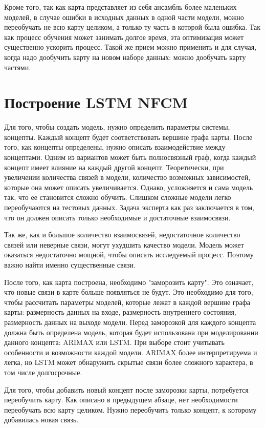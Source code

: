 Кроме того, так как карта представляет из себя ансамбль
более маленьких моделей, в случае ошибки в исходных данных
в одной части модели, можно переобучать не всю карту целиком,
а только ту часть в которой была ошибка. Так как процесс обучения
может занимать долгое время, эта оптимизация может существенно ускорить процесс.
Такой же прием можно применить и для случая, когда надо дообучить карту на
новом наборе данных: можно дообучать карту частями.

\section{Построение LSTM NFCM}

Для того, чтобы создать модель, нужно определить параметры системы, концепты.
Каждый концепт будет соответствовать вершине графа карты.
После того, как концепты определены, нужно описать взаимодействие между концептами.
Одним из вариантов может быть полносвязный граф, когда каждый концепт имеет
влияние на каждый другой концепт. Теоретически, при увеличении количества
связей в модели, количество возможных зависимостей, которые она может описать
увеличивается. Однако, усложняется и сама модель так, что ее становится сложно обучить.
Слишком сложные модели легко переобучаются на тестовых данных.
Задача эксперта как раз заключается в том, что он должен
описать только необходимые и достаточные взаимосвязи.

Так же, как и большое количество взаимосвязей,
недостаточное количество связей или неверные связи, могут ухудшить
качество модели. Модель может оказаться недостаточно мощной, чтобы описать
исследуемый процесс. Поэтому важно найти именно существенные связи.

После того, как карта построена, необходимо "заморозить карту".
Это означает, что новые связи в карте больше появляться не будут.
Это необходимо для того, чтобы рассчитать параметры моделей, которые
лежат в каждой вершине графа карты: размерность данных на входе,
размерность внутреннего состояния, размерность данных на выходе модели.
Перед заморозкой для каждого концепта должна быть определена модель,
которая будет использована при моделировании данного концепта: ARIMAX или LSTM.
При выборе стоит учитывать особенности и возможности каждой модели.
ARIMAX более интерпретируема и легка, но LSTM может обнаружить
скрытые связи более сложного характера, в том числе долгосрочные.

Для того, чтобы добавить новый концепт после заморозки карты,
потребуется переобучить карту. Как описано в предыдущем абзаце,
нет необходимости переобучать всю карту целиком. Нужно переобучить только
концепт, к которому добавилась новая связь.

